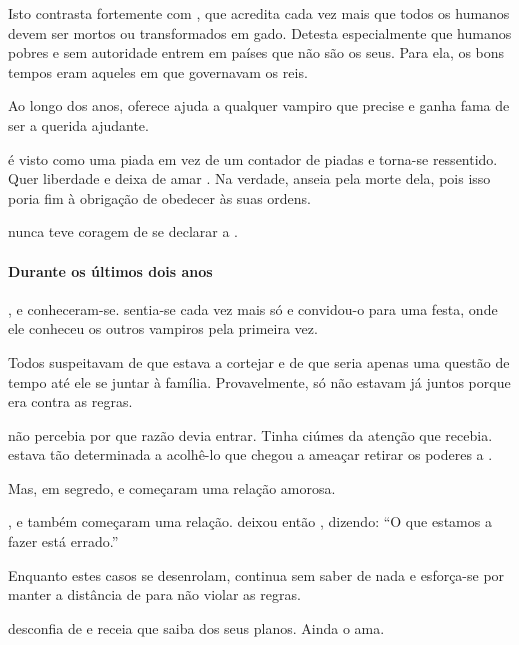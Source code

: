 Isto contrasta fortemente com , que acredita cada vez mais que todos os humanos devem ser mortos ou transformados em gado. Detesta especialmente que humanos pobres e sem autoridade entrem em países que não são os seus. Para ela, os bons tempos eram aqueles em que governavam os reis.

Ao longo dos anos,  oferece ajuda a qualquer vampiro que precise e ganha fama de ser a querida ajudante.

 é visto como uma piada em vez de um contador de piadas e torna-se ressentido. Quer liberdade e deixa de amar . Na verdade, anseia pela morte dela, pois isso poria fim à obrigação de obedecer às suas ordens.

 nunca teve coragem de se declarar a .

\paragraph{Durante os últimos dois anos}

,  e  conheceram-se.  sentia-se cada vez mais só e convidou-o para uma festa, onde ele conheceu os outros vampiros pela primeira vez.

Todos suspeitavam de que  estava a cortejar  e de que seria apenas uma questão de tempo até ele se juntar à família. Provavelmente, só não estavam já juntos porque era contra as regras.

 não percebia por que razão  devia entrar. Tinha ciúmes da atenção que recebia.  estava tão determinada a acolhê-lo que chegou a ameaçar retirar os poderes a .

Mas, em segredo,  e  começaram uma relação amorosa.

,  e  também começaram uma relação.  deixou então , dizendo: ``O que estamos a fazer está errado.''

Enquanto estes casos se desenrolam,  continua sem saber de nada e esforça-se por manter a distância de  para não violar as regras.

 desconfia de  e receia que saiba dos seus planos. Ainda o ama.

